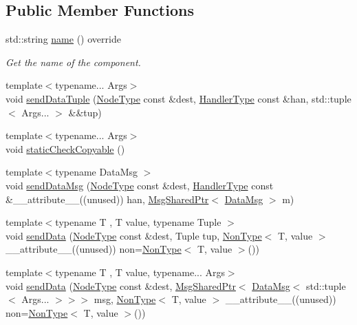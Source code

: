 \subsection*{Public Member Functions}
\begin{DoxyCompactItemize}
\item 
std\+::string \hyperlink{structvt_1_1param_1_1_param_a848380f8509c11b8bffcf0724af77127}{name} () override
\begin{DoxyCompactList}\small\item\em Get the name of the component. \end{DoxyCompactList}\item 
{\footnotesize template$<$typename... Args$>$ }\\void \hyperlink{structvt_1_1param_1_1_param_ac12a098c0d64dcd483cdb590874e45ca}{send\+Data\+Tuple} (\hyperlink{namespacevt_a866da9d0efc19c0a1ce79e9e492f47e2}{Node\+Type} const \&dest, \hyperlink{namespacevt_af64846b57dfcaf104da3ef6967917573}{Handler\+Type} const \&han, std\+::tuple$<$ Args... $>$ \&\&tup)
\item 
{\footnotesize template$<$typename... Args$>$ }\\void \hyperlink{structvt_1_1param_1_1_param_a8d670f74eb5f0a1b5ea312e8b174b648}{static\+Check\+Copyable} ()
\item 
{\footnotesize template$<$typename Data\+Msg $>$ }\\void \hyperlink{structvt_1_1param_1_1_param_acad0af6824812d028e5e0f088b4757dd}{send\+Data\+Msg} (\hyperlink{namespacevt_a866da9d0efc19c0a1ce79e9e492f47e2}{Node\+Type} const \&dest, \hyperlink{namespacevt_af64846b57dfcaf104da3ef6967917573}{Handler\+Type} const \&\+\_\+\+\_\+attribute\+\_\+\+\_\+((unused)) han, \hyperlink{namespacevt_ab2b3d506ec8e8d1540aede826d84a239}{Msg\+Shared\+Ptr}$<$ \hyperlink{structvt_1_1param_1_1_data_msg}{Data\+Msg} $>$ m)
\item 
{\footnotesize template$<$typename T , T value, typename Tuple $>$ }\\void \hyperlink{structvt_1_1param_1_1_param_a6b2fedacd76ee622efdb14038b0d82fe}{send\+Data} (\hyperlink{namespacevt_a866da9d0efc19c0a1ce79e9e492f47e2}{Node\+Type} const \&dest, Tuple tup, \hyperlink{structvt_1_1param_1_1_non_type}{Non\+Type}$<$ T, value $>$ \+\_\+\+\_\+attribute\+\_\+\+\_\+((unused)) non=\hyperlink{structvt_1_1param_1_1_non_type}{Non\+Type}$<$ T, value $>$())
\item 
{\footnotesize template$<$typename T , T value, typename... Args$>$ }\\void \hyperlink{structvt_1_1param_1_1_param_af0791eb37c18d175bdcce5e2f2384427}{send\+Data} (\hyperlink{namespacevt_a866da9d0efc19c0a1ce79e9e492f47e2}{Node\+Type} const \&dest, \hyperlink{namespacevt_ab2b3d506ec8e8d1540aede826d84a239}{Msg\+Shared\+Ptr}$<$ \hyperlink{structvt_1_1param_1_1_data_msg}{Data\+Msg}$<$ std\+::tuple$<$ Args... $>$$>$$>$ msg, \hyperlink{structvt_1_1param_1_1_non_type}{Non\+Type}$<$ T, value $>$ \+\_\+\+\_\+attribute\+\_\+\+\_\+((unused)) non=\hyperlink{structvt_1_1param_1_1_non_type}{Non\+Type}$<$ T, value $>$())

\end{DoxyCompactItemize}
